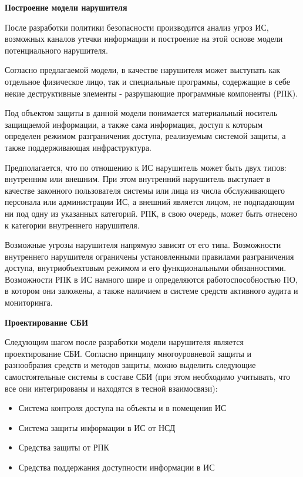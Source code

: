 \bigbreak
\textbf{Построение модели нарушителя}

После разработки политики безопасности производится анализ угроз ИС, возможных каналов утечки информации и
построение на этой основе модели потенциального нарушителя.

Согласно предлагаемой модели, в качестве нарушителя может выступать как отдельное физическое лицо,
так и специальные программы, содержащие в себе некие деструктивные элементы - разрушающие программные компоненты (РПК).

Под объектом защиты в данной модели понимается материальный носитель защищаемой информации, а также сама информация,
доступ к которым определен режимом разграничения доступа, реализуемым системой защиты, а также поддерживающая инфраструктура.

Предполагается, что по отношению к ИС нарушитель может быть двух типов: внутренним или внешним.
При этом внутренний нарушитель выступает в качестве законного пользователя системы или лица из числа
обслуживающего персонала или администрации ИС, а внешний является лицом, не подпадающим ни под
одну из указанных категорий. РПК, в свою очередь, может быть отнесено к категории внутреннего нарушителя.

Возможные угрозы нарушителя напрямую зависят от его типа. Возможности внутреннего нарушителя ограничены
установленными правилами разграничения доступа, внутриобъектовым режимом и его функциональными обязанностями.
Возможности РПК в ИС намного шире и определяются работоспособностью ПО, в котором они заложены,
а также наличием в системе средств активного аудита и мониторинга.

\bigbreak
\textbf{Проектирование СБИ}

Следующим шагом после разработки модели нарушителя является проектирование СБИ.
Согласно принципу многоуровневой защиты и разнообразия средств и методов защиты, можно выделить следующие
самостоятельные системы в составе СБИ (при этом необходимо учитывать, что все они интегрированы
и находятся в тесной взаимосвязи):
\begin{itemize}
    \item Система контроля доступа на объекты и в помещения ИС
    \item Система защиты информации в ИС от НСД
    \item Средства защиты от РПК
    \item Средства поддержания доступности информации в ИС
\end{itemize}

